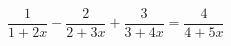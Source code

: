 \begin{ex}[type=equation]
	\begin{condition}
		$\dfrac{1 }{1+2x} - \dfrac{2}{2 + 3x} + \dfrac{3}{3 + 4x} = \dfrac{4}{4+ 5x}$
	\end{condition}
\end{ex}
